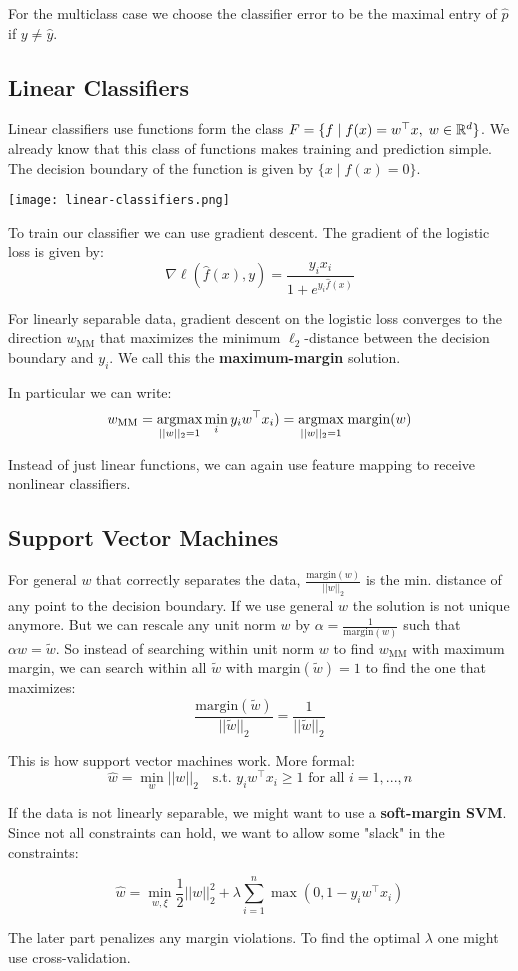 For the multiclass case we choose the classifier error to be the maximal entry of $\hat{p}$ if $y \neq \hat{y}$.

\subsection{Linear Classifiers}

Linear classifiers use functions form the class $F = \{ f \; | \; f(x) = w^\top x, \; w \in \mathbb{R}^d\}$. We already know that this class of functions makes training and prediction simple. The decision boundary of the function is given by $\{ x \; | \; f(x) = 0\}$.

\begin{center}
	\texttt{[image: linear-classifiers.png]}
\end{center}

To train our classifier we can use gradient descent. The gradient of the logistic loss is given by:
$$\nabla \ell(\hat{f}(x), y) = \frac{y_i x_i}{1 + e^{y_i \hat{f}(x)}}$$
 
 For linearly separable data, gradient descent on the logistic loss converges to the direction $w_\text{MM}$ that maximizes the minimum $\ell_2$-distance between the decision boundary and $y_i$. We call this the \textbf{maximum-margin} solution.
 
 In particular we can write:
 $$w_\text{MM} = \underset{||w||_2 = 1}{\text{argmax}} \min_i y_i w^\top x_i ) = \underset{||w||_2 = 1}{\text{argmax}} \; \text{margin} (w)$$
 
 Instead of just linear functions, we can again use feature mapping to receive nonlinear classifiers.
 
 \subsection{Support Vector Machines}
 
 For general $w$ that correctly separates the data, $\frac{\text{margin}(w)}{||w||_2}$ is the min. distance of any point to the decision boundary. If we use general $w$ the solution is not unique anymore. But we can rescale any unit norm $w$ by $\alpha = \frac{1}{\text{margin}(w)}$ such that $\alpha w = \tilde{w}$. So instead of searching within unit norm $w$ to find $w_\text{MM}$ with maximum margin, we can search within all $\tilde{w}$ with margin$(\tilde{w}) = 1$ to find the one that maximizes:
 $$\frac{\text{margin}(\tilde{w})}{||\tilde{w}||_2} = \frac{1}{||\tilde{w}||_2}$$ 
 
 This is how support vector machines work. More formal:
 $$\hat{w} = \min_w ||w||_2 \quad \text{s.t. } y_i w^\top x_i \geq 1 \text{ for all } i=1,...,n$$
 
 If the data is not linearly separable, we might want to use a \textbf{soft-margin SVM}. Since not all constraints can hold, we want to allow some "slack" in the constraints:
 
  $$\hat{w} = \min_{w, \xi} \frac{1}{2} ||w||_2^2 + \lambda \sum_{i=1}^n \max (0, 1 - y_i w^\top x_i)$$
  
  The later part penalizes any margin violations. To find the optimal $\lambda$ one might use cross-validation.
  